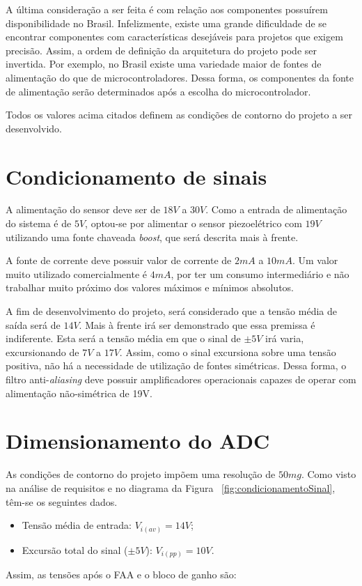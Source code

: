 \documentclass[
	12pt,				%
	openright,			%
	twoside,			%
	a4paper,			%
	english,			%
	french,				%
	spanish,			%
	brazil,				%
	]{abntex2}
\begin{document}
		A última consideração a ser feita é com relação aos componentes
		possuírem disponibilidade no Brasil. Infelizmente, existe uma grande
		dificuldade de se encontrar componentes com características
		desejáveis para projetos que exigem precisão. Assim, a ordem de
		definição da arquitetura do projeto pode ser invertida. Por exemplo,
		no Brasil existe uma variedade maior de fontes de alimentação do que
		de microcontroladores. Dessa forma, os componentes da fonte de
		alimentação serão determinados após a escolha do microcontrolador.
		
		Todos os valores acima citados definem as condições de contorno do
		projeto a ser desenvolvido.

	\section{Condicionamento de sinais}

		A alimentação do sensor deve ser de $18V$ a $30V$. Como a entrada de
		alimentação do sistema é de $5V$, optou-se por alimentar o sensor
		piezoelétrico com $19V$ utilizando uma fonte chaveada \textit{boost}, que será
		descrita mais à frente.

		A fonte de corrente deve possuir valor de corrente de $2mA$ a $10mA$. Um valor muito
		utilizado comercialmente é $4mA$, por ter um consumo intermediário e não trabalhar
		muito próximo dos valores máximos e mínimos absolutos.

		A fim de desenvolvimento do projeto, será considerado que a tensão
		média de saída será de $14V$. Mais à frente irá ser demonstrado que
		essa premissa é indiferente. Esta será a tensão média em que o sinal
		de $\pm 5V$ irá varia, excursionando de $7V$ a $17V$. Assim, como o
		sinal excursiona sobre uma tensão positiva, não há a necessidade de
		utilização de fontes simétricas. Dessa forma, o filtro
		anti-\textit{aliasing} deve possuir amplificadores operacionais
		capazes de operar com alimentação não-simétrica de 19V.

	\section{Dimensionamento do ADC}
		
		As condições de contorno do projeto impõem uma resolução de $50mg$. Como
		visto na análise de requisitos e no diagrama da Figura ~\ref{fig:condicionamentoSinal},
		têm-se os seguintes dados.
		\begin{itemize}
			
			\item Tensão média de entrada: $V_{i(av)} = 14V$;
			\item Excursão total do sinal ($\pm5V$): $V_{i(pp)} = 10V$.
			
		\end{itemize}
		Assim, as tensões após o FAA e o bloco de ganho são:
\end{document}
